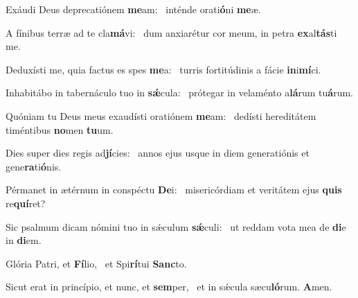 \item Exáudi Deus deprecatiónem \textbf{me}am:~\psstar{} inténde orati\textbf{ó}ni \textbf{me}æ.
\item A fínibus terræ ad te cla\textbf{má}vi:~\psstar{} dum anxiarétur cor meum, in petra \textbf{ex}al\textbf{tás}ti me.
\item Deduxísti me, quia factus es spes \textbf{me}a:~\psstar{} turris fortitúdinis a fácie \textbf{in}i\textbf{mí}ci.
\item Inhabitábo in tabernáculo tuo in \textbf{sǽ}cula:~\psstar{} prótegar in velaménto a\textbf{lá}rum tu\textbf{á}rum.
\item Quóniam tu Deus meus exaudísti oratiónem \textbf{me}am:~\psstar{} dedísti hereditátem timéntibus \textbf{no}men \textbf{tu}um.
\item Dies super dies regis ad\textbf{jí}cies:~\psstar{} annos ejus usque in diem generatiónis et gene\textbf{ra}ti\textbf{ó}nis.
\item Pérmanet in ætérnum in conspéctu \textbf{De}i:~\psstar{} misericórdiam et veritátem ejus \textbf{quis} re\textbf{quí}ret?
\item Sic psalmum dicam nómini tuo in sǽculum \textbf{sǽ}culi:~\psstar{} ut reddam vota mea de \textbf{di}e in \textbf{di}em.
\item Glória Patri, et \textbf{Fí}lio,~\psstar{} et Spi\textbf{rí}tui \textbf{Sanc}to.
\item Sicut erat in princípio, et nunc, et \textbf{sem}per,~\psstar{} et in sǽcula sæcu\textbf{ló}rum. \textbf{A}men.
